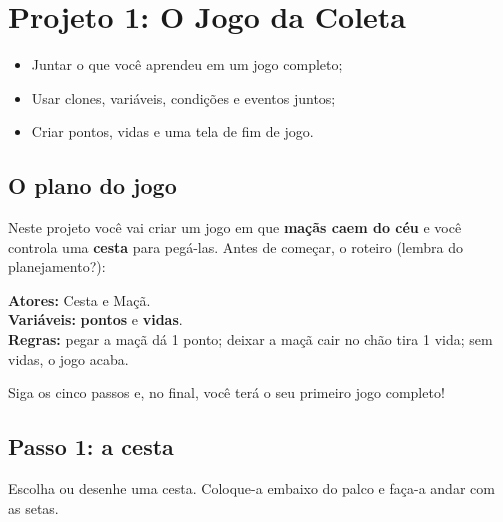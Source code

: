 \chapter{Projeto 1: O Jogo da Coleta}

\begin{objetivos}
\begin{itemize}
\item Juntar o que você aprendeu em um jogo completo;
\item Usar clones, variáveis, condições e eventos juntos;
\item Criar pontos, vidas e uma tela de fim de jogo.
\end{itemize}
\end{objetivos}

\section{O plano do jogo}

Neste projeto você vai criar um jogo em que \textbf{maçãs caem do céu} e você controla uma \textbf{cesta} para pegá-las. Antes de começar, o roteiro (lembra do planejamento?):

\begin{definicao}
\textbf{Atores:} Cesta e Maçã.\\
\textbf{Variáveis:} \textbf{pontos} e \textbf{vidas}.\\
\textbf{Regras:} pegar a maçã dá 1 ponto; deixar a maçã cair no chão tira 1 vida; sem vidas, o jogo acaba.
\end{definicao}

\begin{missao}
Siga os cinco passos e, no final, você terá o seu primeiro jogo completo!
\end{missao}

\section{Passo 1: a cesta}

Escolha ou desenhe uma cesta. Coloque-a embaixo do palco e faça-a andar com as setas.

\begin{codigo}[Cesta]
\begin{pilha}
\end{pilha}
\begin{pilha}
\end{pilha}
\begin{pilha}
\end{pilha}
\end{codigo}

